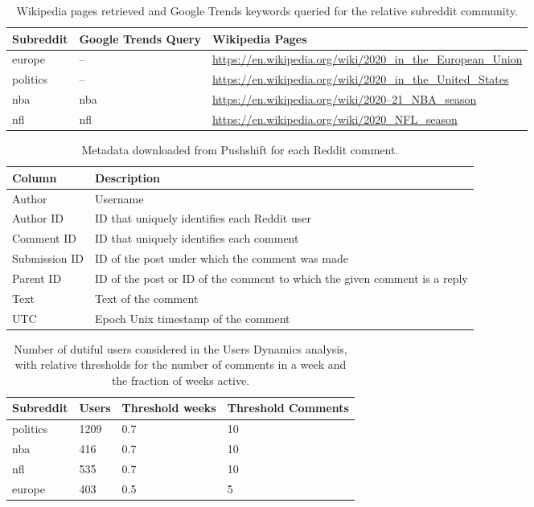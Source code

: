 \documentclass[fleqn,10pt]{wlscirep}
\begin{document}
%
%
\begin{table}[h!]
    \caption{Wikipedia pages retrieved and Google Trends keywords queried for the relative subreddit community.\label{tab_sm_data_pages}}%
    \begin{tabular*}{\columnwidth}{@{\extracolsep\fill}lll@{\extracolsep\fill}}
    \toprule
    {\textbf{Subreddit}} & {\textbf{Google Trends Query}} & {\textbf{Wikipedia Pages}}\\
    \midrule
       europe & -- & \url{https://en.wikipedia.org/wiki/2020_in_the_European_Union} \\
     politics & -- & \url{https://en.wikipedia.org/wiki/2020_in_the_United_States} \\
      nba & nba &          \url{https://en.wikipedia.org/wiki/2020–21_NBA_season} \\
      nfl & nfl &              \url{https://en.wikipedia.org/wiki/2020_NFL_season} \\
    \bottomrule
    \end{tabular*}
\end{table}
%
%
\begin{table}[h!]
    \caption{Metadata downloaded from Pushshift for each Reddit comment.\label{tab_sm_data_comments}}%
    \begin{tabular*}{\columnwidth}{@{\extracolsep\fill}ll@{\extracolsep\fill}}
		\toprule
		{\textbf{Column}} & {\textbf{Description}}\\
		\midrule
		Author &  Username\\
		Author ID & ID that uniquely identifies each Reddit user\\
		Comment ID & ID that uniquely identifies each comment\\
		Submission ID &	ID of the post under which the comment was made\\
		Parent ID &	ID of the post or ID of the comment to which the given comment is a reply\\
		Text & Text of the comment\\
		UTC & Epoch Unix timestamp of the comment\\
        \bottomrule
    \end{tabular*}
\end{table}
%
%
\begin{table}[h!]
    \caption{Number of dutiful users considered in the Users Dynamics analysis, with relative thresholds for the number of comments in a week and the fraction of weeks active.\label{tab_sm_users_ud}}%
    \begin{tabular*}{\columnwidth}{@{\extracolsep\fill}llll@{\extracolsep\fill}}
		\toprule
        {\textbf{Subreddit}} & {\textbf{Users}} & {\textbf{Threshold weeks}} & {\textbf{Threshold Comments}}\\
        \midrule
        politics & 1209 & 0.7 & 10\\
        nba & 416 & 0.7 & 10\\
        nfl & 535 & 0.7 & 10\\
        europe & 403 & 0.5 & 5\\
        \bottomrule
    \end{tabular*}
\end{table}
%
%
\pagebreak[2]
\clearpage
%
%
\end{document}
